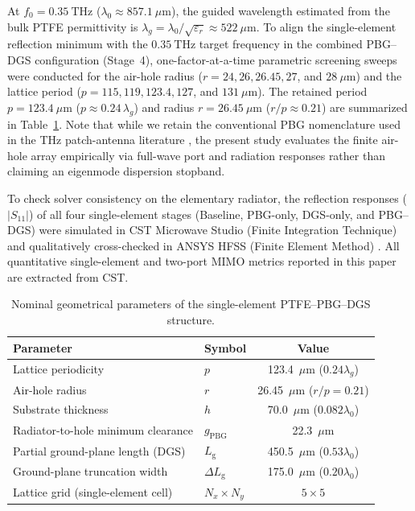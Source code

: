 \documentclass[referee,pdflatex,sn-mathphys-ay]{sn-jnl}
\begin{document}
At $f_0 = 0.35~\mathrm{THz}$ ($\lambda_0 \approx 857.1~\mu\mathrm{m}$), the guided wavelength estimated from the bulk PTFE permittivity is \(\lambda_g = \lambda_0/\sqrt{\varepsilon_r} \approx 522~\mu\mathrm{m}\). To align the single-element reflection minimum with the $0.35~\mathrm{THz}$ target frequency in the combined PBG--DGS configuration (Stage~4), one-factor-at-a-time parametric screening sweeps were conducted for the air-hole radius ($r = 24, 26, 26.45, 27$, and $28~\mu\mathrm{m}$) and the lattice period ($p = 115, 119, 123.4, 127$, and $131~\mu\mathrm{m}$). The retained period $p = 123.4~\mu\mathrm{m}$ ($p \approx 0.24\,\lambda_g$) and radius $r = 26.45~\mu\mathrm{m}$ ($r/p \approx 0.21$) are summarized in Table~\ref{tab:pbg-params}. Note that while we retain the conventional PBG nomenclature used in the THz patch-antenna literature \citep{khezzar_pbg_2021,babaahmed_hybrid_2025,bouzid_pbg_2025}, the present study evaluates the finite air-hole array empirically via full-wave port and radiation responses rather than claiming an eigenmode dispersion stopband.

To check solver consistency on the elementary radiator, the reflection responses ($|S_{11}|$) of all four single-element stages (Baseline, PBG-only, DGS-only, and PBG--DGS) were simulated in CST Microwave Studio (Finite Integration Technique) and qualitatively cross-checked in ANSYS HFSS (Finite Element Method) \citep{algburi2026csthfss}. All quantitative single-element and two-port MIMO metrics reported in this paper are extracted from CST.

\begin{table}[ht]
\caption{Nominal geometrical parameters of the single-element PTFE--PBG--DGS structure.}
\label{tab:pbg-params}
\centering
\begin{tabular}{llc}
\hline
\textbf{Parameter} & \textbf{Symbol} & \textbf{Value} \\
\hline
Lattice periodicity & \(p\) & 123.4~\(\mu\mathrm{m}\) (\(0.24\lambda_g\)) \\
Air-hole radius & \(r\) & 26.45~\(\mu\mathrm{m}\) (\(r/p = 0.21\)) \\
Substrate thickness & \(h\) & 70.0~\(\mu\mathrm{m}\) (\(0.082\lambda_0\)) \\
Radiator-to-hole minimum clearance & \(g_{\mathrm{PBG}}\) & 22.3~\(\mu\mathrm{m}\) \\
Partial ground-plane length (DGS) & \(L_{\mathrm{g}}\) & 450.5~\(\mu\mathrm{m}\) (\(0.53\lambda_0\)) \\
Ground-plane truncation width & \(\Delta L_{\mathrm{g}}\) & 175.0~\(\mu\mathrm{m}\) (\(0.20\lambda_0\)) \\
Lattice grid (single-element cell) & \(N_x \times N_y\) & \(5 \times 5\) \\
\hline
\end{tabular}
\end{table}
\end{document}

